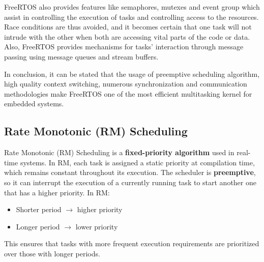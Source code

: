\noindent FreeRTOS also provides features like semaphores, mutexes and event group which assist in controlling the execution of tasks and controlling access to the resources. Race conditions are thus avoided, and it becomes certain that one task will not intrude with the other when both are accessing vital parts of the code or data. Also, FreeRTOS provides mechanisms for tasks’ interaction through message passing using message queues and stream buffers. 

\noindent In conclusion, it can be stated that the usage of preemptive scheduling algorithm, high quality context switching, numerous synchronization and communication methodologies make FreeRTOS one of the most efficient multitasking kernel for embedded systems.

\subsection{Rate Monotonic (RM) Scheduling}
Rate Monotonic (RM) Scheduling is a \textbf{fixed-priority algorithm} used in real-time systems. In RM, each task is assigned a static priority at compilation time, which remains constant throughout its execution. The scheduler is \textbf{preemptive}, so it can interrupt the execution of a currently running task to start another one that has a higher priority. In RM:
    \begin{itemize}
        \item Shorter period $\rightarrow$ higher priority
        \item Longer period $\rightarrow$ lower priority
    \end{itemize}
This ensures that tasks with more frequent execution requirements are prioritized over those with longer periods.